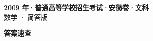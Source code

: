\documentclass[zihao=-4, a4paper]{ctexart}
\begin{document}
\begin{center}
  {\Large\bfseries 2009 年·普通高等学校招生考试·安徽卷·文科}\\[4pt]
  {\large 数学 · 简答版}
\end{center}
\medskip
{}

\clearpage
{}
\begin{center}{\Large\bfseries 答案速查}\end{center}
\medskip

\end{document}
